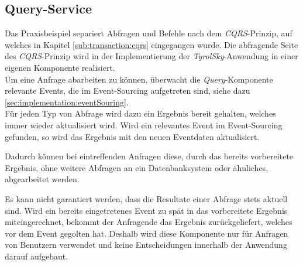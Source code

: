 \subsection{Query-Service}
Das Praxisbeispiel separiert Abfragen und Befehle nach dem \textit{CQRS}-Prinzip, auf welches in Kapitel \ref{sub:transaction:cqrs} eingegangen wurde. Die abfragende Seite des \textit{CQRS}-Prinzip wird in der Implementierung der \textit{TyrolSky}-Anwendung in einer eigenen Komponente realisiert. \\
Um eine Anfrage abarbeiten zu können, überwacht die \textit{Query}-Komponente relevante Events, die im Event-Sourcing aufgetreten sind, siehe dazu \ref{sec:implementation:eventSouring}. \\
Für jeden Typ von Abfrage wird dazu ein Ergebnis bereit gehalten, welches immer wieder aktualisiert wird. Wird ein relevantes Event im Event-Sourcing gefunden, so wird das Ergebnis mit den neuen Eventdaten aktualisiert.

Dadurch können bei eintreffenden Anfragen diese, durch das bereits vorbereitete Ergebnis, ohne weitere Abfragen an ein Datenbanksystem oder ähnliches, abgearbeitet werden. 

Es kann nicht garantiert werden, dass die Resultate einer Abfrage stets aktuell sind. Wird ein bereits eingetretenes Event zu spät in das vorbereitete Ergebnis miteingerechnet, bekommt der Anfragende das Ergebnis zurückgeliefert, welches vor dem Event gegolten hat. Deshalb wird diese Komponente nur für Anfragen von Benutzern verwendet und keine Entscheidungen innerhalb der Anwendung darauf aufgebaut.

